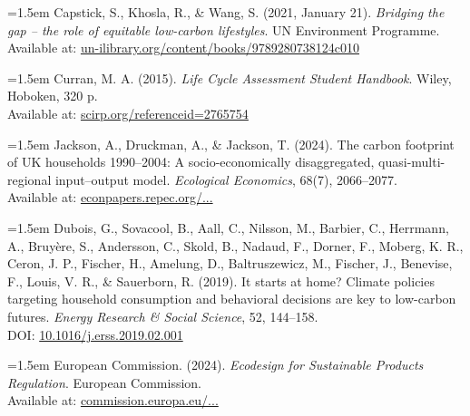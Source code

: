 \documentclass[12pt,a4paper]{article}%
\begin{document}
\vspace{0.5em}
{\small
\noindent
\parbox{\linewidth}{
\hangindent=1.5em
Capstick, S., Khosla, R., \& Wang, S. (2021, January 21). \textit{Bridging the gap – the role of equitable low-carbon lifestyles}. UN Environment Programme. \\
Available at: \href{https://www.un-ilibrary.org/content/books/9789280738124c010}{un-ilibrary.org/content/books/9789280738124c010}
}
}

\vspace{0.5em}
{\small
\noindent
\parbox{\linewidth}{
\hangindent=1.5em
Curran, M. A. (2015). \textit{Life Cycle Assessment Student Handbook}. Wiley, Hoboken, 320 p. \\
Available at: \href{https://www.scirp.org/reference/referencespapers?referenceid=2765754}{scirp.org/referenceid=2765754}
}
}

\vspace{0.5em}
{\small
\noindent
\parbox{\linewidth}{
\hangindent=1.5em
Jackson, A., Druckman, A., \& Jackson, T. (2024). The carbon footprint of UK households 1990–2004: A socio-economically disaggregated, quasi-multi-regional input–output model. \textit{Ecological Economics}, 68(7), 2066–2077. \\
Available at: \href{https://econpapers.repec.org/article/eeeecolec/v_3a68_3ay_3a2009_3ai_3a7_3ap_3a2066-2077.htm}{econpapers.repec.org/...}
}
}

\vspace{0.5em}
{\small
\noindent
\parbox{\linewidth}{
\hangindent=1.5em
Dubois, G., Sovacool, B., Aall, C., Nilsson, M., Barbier, C., Herrmann, A., Bruyère, S., Andersson, C., Skold, B., Nadaud, F., Dorner, F., Moberg, K. R., Ceron, J. P., Fischer, H., Amelung, D., Baltruszewicz, M., Fischer, J., Benevise, F., Louis, V. R., \& Sauerborn, R. (2019). It starts at home? Climate policies targeting household consumption and behavioral decisions are key to low-carbon futures. \textit{Energy Research \& Social Science}, 52, 144–158. \\
DOI: \href{https://doi.org/10.1016/j.erss.2019.02.001}{10.1016/j.erss.2019.02.001}
}
}

\vspace{0.5em}
{\small
\noindent
\parbox{\linewidth}{
\hangindent=1.5em
European Commission. (2024). \textit{Ecodesign for Sustainable Products Regulation}. European Commission. \\
Available at: \href{https://commission.europa.eu/energy-climate-change-environment/standards-tools-and-labels/products-labelling-rules-and-requirements/ecodesign-sustainable-products-regulation_en}{commission.europa.eu/...}
}
}
\end{document}
